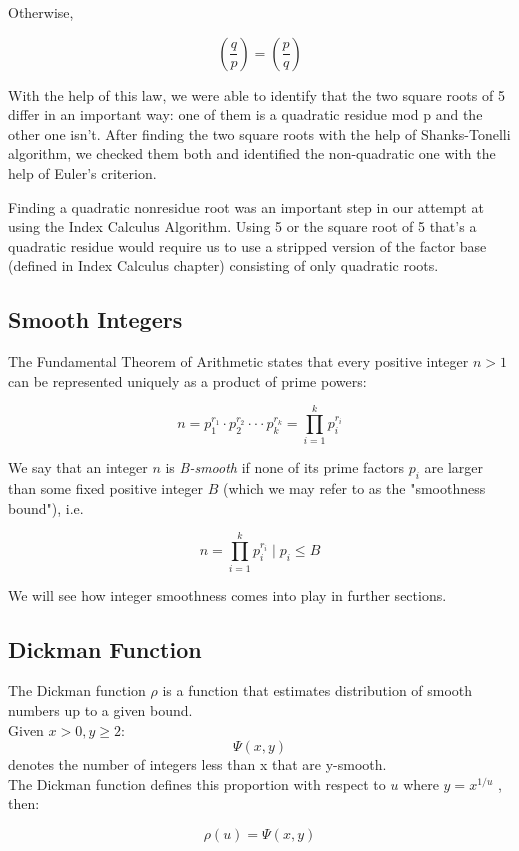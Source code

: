 \documentclass{article}
\begin{document}
Otherwise,

$$\left(\frac{q}{p}\right) = \left(\frac{p}{q}\right)$$

With the help of this law, we were able to identify that the two square roots of 5 differ in an important way: one of them is a quadratic residue mod p and the other one isn't. After finding the two square roots with the help of Shanks-Tonelli algorithm, we checked them both and identified the non-quadratic one with the help of Euler's criterion.

Finding a quadratic nonresidue root was an important step in our attempt at using the Index Calculus Algorithm. Using 5 or the square root of 5 that's a quadratic residue would require us to use a stripped version of the factor base (defined in Index Calculus chapter) consisting of only quadratic roots.

\subsection{Smooth Integers}

The Fundamental Theorem of Arithmetic states that every positive integer $n > 1$ can be represented uniquely as a product of prime powers:

$$n = p_1^{r_1} \cdot p_2^{r_2} \cdot \cdot \cdot p_k^{r_k} = \prod_{i = 1}^{k} p_i^{r_i}$$

We say that an integer $n$ is \emph{B-smooth} if none of its prime factors $p_i$ are larger than some fixed positive integer $B$ (which we may refer to as the "smoothness bound"), i.e.

$$n = \prod_{i = 1}^{k} p_i^{r_i} \mid p_i \leq B$$

We will see how integer smoothness comes into play in further sections.

\subsection{Dickman Function}

The Dickman function $\rho$ is a function that estimates distribution of smooth numbers up to a given bound.\\
Given $x > 0, y \geq 2$: $$\Psi(x, y)$$ denotes the number of integers less than x that are y-smooth.\\
The Dickman function defines this proportion with respect to $u$ where $y = x^{1/u}$ \autocite{DeBruijn1951}, then:

$$\rho(u) = \Psi(x, y)$$
\end{document}
